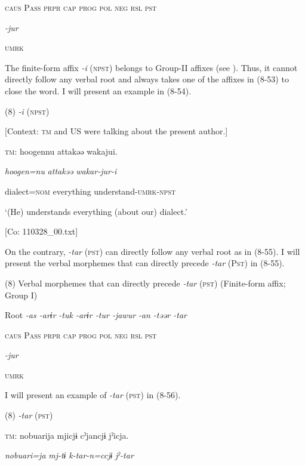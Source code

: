     \textsc{caus}  P\textsc{ass}  \textsc{prpr}  \textsc{cap}  \textsc{prog}  \textsc{pol}  \textsc{neg}  \textsc{rsl}  \textsc{pst}

          \textit{{}-jur} 

          \textsc{umrk}

The finite-form affix \textit{{}-i} (\textsc{npst}) belongs to Group-II affixes (see ). Thus, it cannot directly follow any verbal root and always takes one of the affixes in (8-53) to close the word. I will present an example in (8-54).

(8)  \textit{{}-i} (\textsc{npst})

  [Context: \textsc{tm} and US were talking about the present author.]

  \textsc{tm}:  {\textbar}hoogen{\textbar}nu  attakəə  wakajui.

    \textit{hoogen=nu}  \textit{attakəə}  \textit{wakar-jur-i}

    dialect=\textsc{nom}  everything  understand-\textsc{umrk}-\textsc{npst}

    ‘(He) understands everything (about our) dialect.’

    [Co: 110328\_00.txt]

  On the contrary, \textit{{}-tar} (\textsc{pst}) can directly follow any verbal root as in (8-55). I will present the verbal morphemes that can directly precede \textit{{}-tar} (P\textsc{st}) in (8-55).

(8)  Verbal morphemes that can directly precede \textit{{}-tar} (\textsc{pst}) (Finite-form affix; Group I)

  Root  \textit{{}-as  {}-arɨr} %
\textit{{}-tuk  {}-arɨr  {}-tur  {}-jawur} %
\textit{{}-an  {}-təər  {}-tar}

    \textsc{caus}  P\textsc{ass}  \textsc{prpr}  \textsc{cap}  \textsc{prog}  \textsc{pol}  \textsc{neg}  \textsc{rsl}  \textsc{pst}

          \textit{{}-jur} 

          \textsc{umrk}

I will present an example of \textit{{}-tar} (\textsc{pst}) in (8-56).

(8)  \textit{{}-tar} (\textsc{pst})

  \textsc{tm}:  nobuarija  mjicjɨ  cˀjancjɨ  jˀicja.

    \textit{nobuari=ja}  \textit{mj-tɨ}  \textit{k-tar-n=ccjɨ}  \textit{jˀ-tar}

